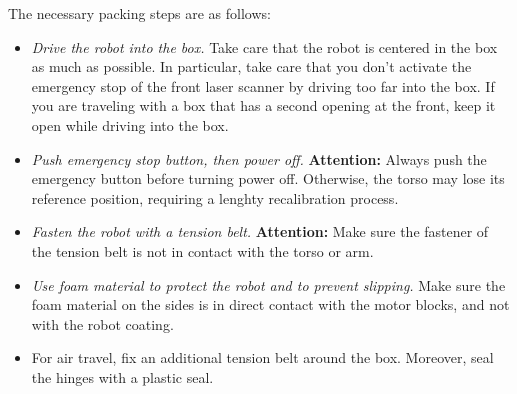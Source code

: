 The necessary packing steps are as follows:
\begin{itemize}
\item {\em Drive the robot into the box.} Take care that the robot is centered in the box as much as possible. In particular, take care that you don't activate the emergency stop of the front laser scanner
by driving too far into the box. If you are traveling with a box that has a second opening at the front, keep it open while driving into the box.
\item {\em Push emergency stop button, then power off.} {\bf Attention:} Always push the emergency button before turning power off. Otherwise, the torso may lose its reference position, requiring a lenghty recalibration process.
\item {\em Fasten the robot with a tension belt.} {\bf Attention:} Make sure the fastener of the tension belt is not in contact with the torso or arm. 
\item {\em Use foam material to protect the robot and to prevent slipping.} Make sure the foam material on the sides is in direct contact with the motor blocks, and not with the robot coating.
\item For air travel, fix an additional tension belt around the box. Moreover, seal the hinges with a plastic seal.
\end{itemize}

\newpage

